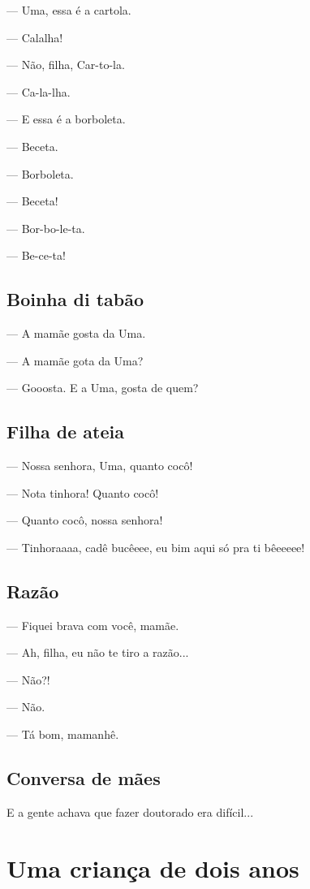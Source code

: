 {\parindent0pt
— Uma, essa é a cartola.

— Calalha!

— Não, filha, Car-to-la.

— Ca-la-lha.

— E essa é a borboleta.

— Beceta.

— Borboleta.

— Beceta!

— Bor-bo-le-ta.

— Be-ce-ta!


\chapter{Boinha di tabão}

— A mamãe gosta da Uma.

— A mamãe gota da Uma?

— Gooosta. E a Uma, gosta de quem?

\chapter{Filha de ateia}

— Nossa senhora, Uma, quanto cocô!

— Nota tinhora! Quanto cocô!

— Quanto cocô, nossa senhora!

— Tinhoraaaa, cadê bucêeee, eu bim aqui só pra ti bêeeeee!

\chapter{Razão}

— Fiquei brava com você, mamãe.

— Ah, filha, eu não te tiro a razão...

— Não?!

— Não.

— Tá bom, mamanhê.
}
\chapter{Conversa de mães}

E a gente achava que fazer doutorado era difícil...

\paginabranca
  \part{Uma criança de dois anos}

